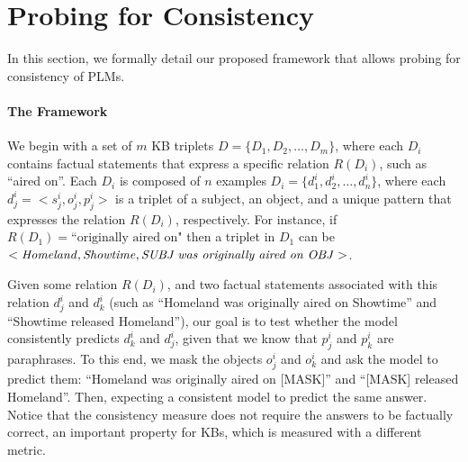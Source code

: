 \section{Probing for Consistency}
\label{sec:framework}

In this section, we formally detail our proposed framework that allows probing for consistency of PLMs.



\paragraph{The Framework}
We begin with a set of $m$ KB triplets $D = \{D_1, D_2, \dots, D_m\}$, where each $D_i$ contains factual statements that express a specific relation $R(D_i)$, such as ``aired on''. Each $D_i$ is composed of $n$ examples $D_i = \{d_1^i, d_2^i, \dots, d_n^i\}$, where each $d_j^i = <s_j^i, o_j^i, p_j^i>$ is a triplet of a subject, an object, and a unique pattern that expresses the relation $R(D_i)$, respectively. For instance, if $R(D_1)=\text{``originally aired on"}$ then a triplet in $D_1$ can be $< \text{\textit{Homeland}}, \text{\textit{Showtime}}, \text{\textit{SUBJ{} was originally aired on OBJ{}}}>$.



Given some relation $R(D_i)$, and two factual statements associated with this relation $d_j^i$ and $d_k^i$ (such as ``Homeland was originally aired on Showtime'' and ``Showtime released Homeland''), our goal is to test whether the model consistently predicts $d_k^i$ and $d_j^i$, given that we know that $p_j^i$ and $p_k^i$ are paraphrases.
To this end, we mask the objects $o_j^i$ and $o_k^i$ and ask the model to predict them: ``Homeland was originally aired on [MASK]'' and ``[MASK] released Homeland''.
Then, expecting a consistent model to predict the same answer.
Notice that the consistency measure does not require the answers to be factually correct, an important property for KBs, which is measured with a different metric.

